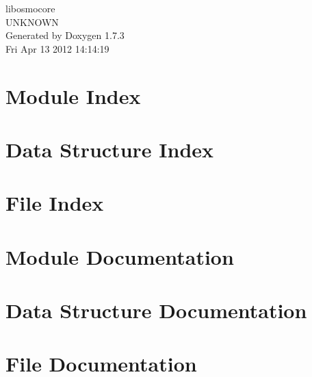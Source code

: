 \documentclass[a4paper]{book}
\begin{document}
\begin{titlepage}
\vspace*{7cm}
\begin{center}
{\Large libosmocore \\[1ex]\large UNKNOWN }\\
\vspace*{1cm}
{\large Generated by Doxygen 1.7.3}\\
\vspace*{0.5cm}
{\small Fri Apr 13 2012 14:14:19}\\
\end{center}
\end{titlepage}
\clearemptydoublepage
{}
\tableofcontents
\clearemptydoublepage
{}
\chapter{Module Index}

\chapter{Data Structure Index}

\chapter{File Index}

\chapter{Module Documentation}

\chapter{Data Structure Documentation}




\chapter{File Documentation}








\printindex
\end{document}
